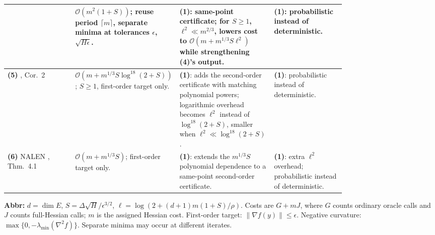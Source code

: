 \begin{table}[tp]
\begin{threeparttable}
\begin{tabularx}{\linewidth}{@{}>{\raggedright\arraybackslash}p{0.20\linewidth}>{\raggedright\arraybackslash}p{0.29\linewidth}>{\raggedright\arraybackslash}p{0.29\linewidth}>{\raggedright\arraybackslash}X@{}}
& $\mathcal O\!\left(m^2(1+S)\right)$; reuse period $\lceil m\rceil$, separate minima at tolerances $\epsilon$, $\sqrt{H\epsilon}$.
& \textbf{(1)}: same-point certificate; for $S\ge1$, $\ell^2\ll m^{2/3}$, lowers cost to $\mathcal O(m+m^{1/3}S\ell^2)$ while strengthening \textbf{(4)}'s output.
& \textbf{(1)}: probabilistic instead of deterministic. \\
\midrule
\textbf{(5)} \citep{hlsABSZ2025v1}, Cor.~2
& $\mathcal O\!\left(m+m^{1/3}S\log^{18}(2+S)\right)$; $S\ge1$, first-order target only.
& \textbf{(1)}: adds the second-order certificate with matching polynomial powers; logarithmic overhead becomes $\ell^2$ instead of $\log^{18}(2+S)$, smaller when $\ell^2\ll\log^{18}(2+S)$.
& \textbf{(1)}: probabilistic instead of deterministic. \\
\midrule
\textbf{(6)} NALEN \citep{hlsCLLZ2026v3}, Thm.~4.1
& $\mathcal O(m+m^{1/3}S)$; first-order target only.
& \textbf{(1)}: extends the $m^{1/3}S$ polynomial dependence to a same-point second-order certificate.
& \textbf{(1)}: extra $\ell^2$ overhead; probabilistic instead of deterministic. \\
\bottomrule
\end{tabularx}
\begin{tablenotes}[flushleft]\footnotesize
\item[] \textbf{Abbr:} $d=\dim E$, $S=\Delta\sqrt H/\epsilon^{3/2}$, $\ell=\log\!\left(2+(d+1)m(1+S)/\rho\right)$. Costs are $G+mJ$, where $G$ counts ordinary oracle calls and $J$ counts full-Hessian calls; $m$ is the assigned Hessian cost. First-order target: $\|\nabla f(y)\|\le\epsilon$. Negative curvature: $\max\{0,-\lambda_{\min}(\nabla^2 f)\}$. Separate minima may occur at different iterates.
\end{tablenotes}
\end{threeparttable}
\end{table}
